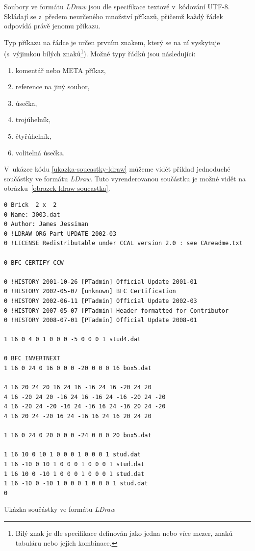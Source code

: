         Soubory ve formátu \textit{LDraw} jsou dle specifikace \autocite{ldraw:file:specification} textové v~kódování \gls{UTF-8}. Skládají se z~předem neurčeného množství příkazů, přičemž každý řádek odpovídá právě jenomu příkazu.

        Typ příkazu na řádce je určen prvním znakem, který se na ní vyskytuje (s~výjimkou bílých znaků\footnote{Bílý znak je dle specifikace \autocite{ldraw:file:specification} definován jako jedna nebo více mezer, znaků tabuláru nebo jejich kombinace.}). Možné typy řádků jsou následující: 
        
        \begin{enumerate}
            \item[0:] komentář nebo META příkaz,
            \item[1:] reference na jiný soubor,
            \item[2:] úsečka,
            \item[3:] trojúhelník,
            \item[4:] čtyřúhelník,
            \item[5:] volitelná úsečka.
        \end{enumerate}

        V~ukázce kódu \ref{ukazka-soucastky-ldraw} můžeme vidět příklad jednoduché součástky ve formátu \textit{LDraw}. Tuto vyrenderovanou součástku je možné vidět na obrázku~\ref{obrazek-ldraw-soucastka}.
            

       \begin{listing}[htbp]
            \begin{verbatim}
0 Brick  2 x  2
0 Name: 3003.dat
0 Author: James Jessiman
0 !LDRAW_ORG Part UPDATE 2002-03
0 !LICENSE Redistributable under CCAL version 2.0 : see CAreadme.txt

0 BFC CERTIFY CCW

0 !HISTORY 2001-10-26 [PTadmin] Official Update 2001-01
0 !HISTORY 2002-05-07 [unknown] BFC Certification
0 !HISTORY 2002-06-11 [PTadmin] Official Update 2002-03
0 !HISTORY 2007-05-07 [PTadmin] Header formatted for Contributor
0 !HISTORY 2008-07-01 [PTadmin] Official Update 2008-01

1 16 0 4 0 1 0 0 0 -5 0 0 0 1 stud4.dat

0 BFC INVERTNEXT
1 16 0 24 0 16 0 0 0 -20 0 0 0 16 box5.dat

4 16 20 24 20 16 24 16 -16 24 16 -20 24 20
4 16 -20 24 20 -16 24 16 -16 24 -16 -20 24 -20
4 16 -20 24 -20 -16 24 -16 16 24 -16 20 24 -20
4 16 20 24 -20 16 24 -16 16 24 16 20 24 20

1 16 0 24 0 20 0 0 0 -24 0 0 0 20 box5.dat

1 16 10 0 10 1 0 0 0 1 0 0 0 1 stud.dat
1 16 -10 0 10 1 0 0 0 1 0 0 0 1 stud.dat
1 16 10 0 -10 1 0 0 0 1 0 0 0 1 stud.dat
1 16 -10 0 -10 1 0 0 0 1 0 0 0 1 stud.dat
0
            \end{verbatim}
            \caption{Ukázka součástky ve formátu \textit{LDraw} \autocite{ldraw:model}\label{ukazka-soucastky-ldraw}}
        \end{listing}
  
